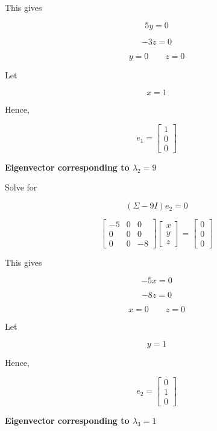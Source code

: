 \documentclass[12pt]{article}
\begin{document}
\noindent
This gives

\[
5y=0
\]

\[
-3z=0
\]

\[
y=0
\qquad
z=0
\]

\noindent
Let

\[
x=1
\]

\noindent
Hence,

\[
\boxed{
e_1=
\begin{bmatrix}
1\\
0\\
0
\end{bmatrix}
}
\]

\vspace{0.5cm}

\noindent
\textbf{Eigenvector corresponding to \(\lambda_2=9\)}

\vspace{0.3cm}

\noindent
Solve for

\[
(\Sigma-9I)e_2=0
\]

\[
\begin{bmatrix}
-5 & 0 & 0\\
0 & 0 & 0\\
0 & 0 & -8
\end{bmatrix}
\begin{bmatrix}
x\\
y\\
z
\end{bmatrix}
=
\begin{bmatrix}
0\\
0\\
0
\end{bmatrix}
\]

\noindent
This gives

\[
-5x=0
\]

\[
-8z=0
\]

\[
x=0
\qquad
z=0
\]

\noindent
Let

\[
y=1
\]

\noindent
Hence,

\[
\boxed{
e_2=
\begin{bmatrix}
0\\
1\\
0
\end{bmatrix}
}
\]

\vspace{0.5cm}

\noindent
\textbf{Eigenvector corresponding to \(\lambda_3=1\)}
\end{document}
